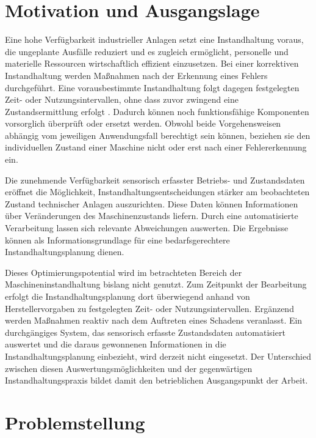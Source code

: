 \section{Motivation und Ausgangslage}
\label{sec:motivation}

Eine hohe Verfügbarkeit industrieller Anlagen setzt eine Instandhaltung voraus,
die ungeplante Ausfälle reduziert und es zugleich ermöglicht,
personelle und materielle Ressourcen wirtschaftlich effizient einzusetzen.
Bei einer korrektiven Instandhaltung werden Maßnahmen nach der Erkennung eines Fehlers durchgeführt.
Eine vorausbestimmte Instandhaltung folgt dagegen festgelegten Zeit- oder Nutzungsintervallen,
ohne dass zuvor zwingend eine Zustandsermittlung erfolgt
\cite[Abschn. 7.2 und 7.9]{zotero-item-24}.
Dadurch können noch funktionsfähige Komponenten vorsorglich überprüft oder ersetzt werden.
Obwohl beide Vorgehensweisen abhängig vom jeweiligen Anwendungsfall berechtigt sein können,
beziehen sie den individuellen Zustand einer Maschine nicht
oder erst nach einer Fehlererkennung ein.

Die zunehmende Verfügbarkeit sensorisch erfasster Betriebs- und Zustandsdaten eröffnet die Möglichkeit,
Instandhaltungsentscheidungen stärker am beobachteten Zustand technischer Anlagen auszurichten.
Diese Daten können Informationen über Veränderungen des Maschinenzustands liefern.
Durch eine automatisierte Verarbeitung lassen sich relevante Abweichungen auswerten.
Die Ergebnisse können als Informationsgrundlage für eine bedarfsgerechtere Instandhaltungsplanung dienen.

Dieses Optimierungspotential wird im betrachteten Bereich der Maschineninstandhaltung
bislang nicht genutzt.
Zum Zeitpunkt der Bearbeitung erfolgt die Instandhaltungsplanung dort überwiegend
anhand von Herstellervorgaben zu festgelegten Zeit- oder Nutzungsintervallen.
Ergänzend werden Maßnahmen reaktiv nach dem Auftreten eines Schadens veranlasst.
Ein durchgängiges System, das sensorisch erfasste Zustandsdaten automatisiert auswertet
und die daraus gewonnenen Informationen in die Instandhaltungsplanung einbezieht,
wird derzeit nicht eingesetzt.
Der Unterschied zwischen diesen Auswertungsmöglichkeiten und der gegenwärtigen
Instandhaltungspraxis bildet damit den betrieblichen Ausgangspunkt der Arbeit.

\section{Problemstellung}
\label{sec:problemstellung}

